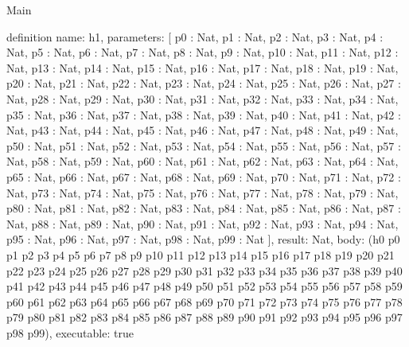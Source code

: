 \begin{lexlean}{Main}
\begin{semanticmodule}
definition{
  name: h1,
  parameters: [
    p0 : Nat,
    p1 : Nat,
    p2 : Nat,
    p3 : Nat,
    p4 : Nat,
    p5 : Nat,
    p6 : Nat,
    p7 : Nat,
    p8 : Nat,
    p9 : Nat,
    p10 : Nat,
    p11 : Nat,
    p12 : Nat,
    p13 : Nat,
    p14 : Nat,
    p15 : Nat,
    p16 : Nat,
    p17 : Nat,
    p18 : Nat,
    p19 : Nat,
    p20 : Nat,
    p21 : Nat,
    p22 : Nat,
    p23 : Nat,
    p24 : Nat,
    p25 : Nat,
    p26 : Nat,
    p27 : Nat,
    p28 : Nat,
    p29 : Nat,
    p30 : Nat,
    p31 : Nat,
    p32 : Nat,
    p33 : Nat,
    p34 : Nat,
    p35 : Nat,
    p36 : Nat,
    p37 : Nat,
    p38 : Nat,
    p39 : Nat,
    p40 : Nat,
    p41 : Nat,
    p42 : Nat,
    p43 : Nat,
    p44 : Nat,
    p45 : Nat,
    p46 : Nat,
    p47 : Nat,
    p48 : Nat,
    p49 : Nat,
    p50 : Nat,
    p51 : Nat,
    p52 : Nat,
    p53 : Nat,
    p54 : Nat,
    p55 : Nat,
    p56 : Nat,
    p57 : Nat,
    p58 : Nat,
    p59 : Nat,
    p60 : Nat,
    p61 : Nat,
    p62 : Nat,
    p63 : Nat,
    p64 : Nat,
    p65 : Nat,
    p66 : Nat,
    p67 : Nat,
    p68 : Nat,
    p69 : Nat,
    p70 : Nat,
    p71 : Nat,
    p72 : Nat,
    p73 : Nat,
    p74 : Nat,
    p75 : Nat,
    p76 : Nat,
    p77 : Nat,
    p78 : Nat,
    p79 : Nat,
    p80 : Nat,
    p81 : Nat,
    p82 : Nat,
    p83 : Nat,
    p84 : Nat,
    p85 : Nat,
    p86 : Nat,
    p87 : Nat,
    p88 : Nat,
    p89 : Nat,
    p90 : Nat,
    p91 : Nat,
    p92 : Nat,
    p93 : Nat,
    p94 : Nat,
    p95 : Nat,
    p96 : Nat,
    p97 : Nat,
    p98 : Nat,
    p99 : Nat
  ],
  result: Nat,
  body: (h0 p0 p1 p2 p3 p4 p5 p6 p7 p8 p9 p10 p11 p12 p13 p14 p15 p16 p17 p18 p19 p20 p21 p22 p23 p24 p25 p26 p27 p28 p29 p30 p31 p32 p33 p34 p35 p36 p37 p38 p39 p40 p41 p42 p43 p44 p45 p46 p47 p48 p49 p50 p51 p52 p53 p54 p55 p56 p57 p58 p59 p60 p61 p62 p63 p64 p65 p66 p67 p68 p69 p70 p71 p72 p73 p74 p75 p76 p77 p78 p79 p80 p81 p82 p83 p84 p85 p86 p87 p88 p89 p90 p91 p92 p93 p94 p95 p96 p97 p98 p99),
  executable: true
}


\end{semanticmodule}
\end{lexlean}
